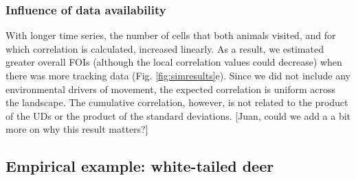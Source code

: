 \documentclass[letterpaper]{article}
\begin{document}
\subsubsection*{Influence of data availability}
With longer time series, the number of cells that both animals visited, and for which correlation is calculated, increased linearly. As a result, we estimated greater overall FOIs (although the local correlation values could decrease) when there was more tracking data (Fig. \ref{fig:simresults}e). 
Since we did not include any environmental drivers of movement, the expected correlation is uniform across the landscape. The cumulative correlation, however, is not related to the product of the UDs or the product of the standard deviations. [Juan, could we add a a bit more on why this result matters?]


\subsection*{Empirical example: white-tailed deer}
\end{document}
